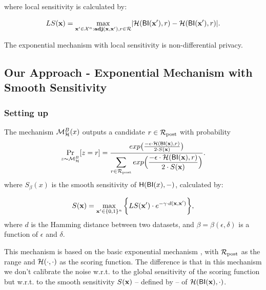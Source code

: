 \documentclass[sigconf]{acmart}
\begin{document}
where local sensitivity is calculated by:

\begin{equation*}
LS(\textbf{x})=\max_{\textbf{x}' \in \mathcal{X}^n:\textbf{adj}(\textbf{x},\textbf{x}'), r\in \mathcal{R}}\lvert \mathcal{H}(\mathsf{BI}(\textbf{x}'), r) - \mathcal{H}(\mathsf{BI}(\textbf{x}'), r)\rvert.
\end{equation*}

The exponential mechanism with local sensitivity is non-differential privacy\cite{dwork2014algorithmic}.


\subsection{Our Approach - Exponential Mechanism with Smooth Sensitivity}
\label{sec_smoo}

\subsubsection{Setting up}

\begin{definition}
\label{def_smoo}
The mechanism $\mathcal{M}^{B}_{\mathcal{H}}(x)$ outputs a candidate $r \in \mathcal{R}_{\textup{post}}$ with probability
\begin{equation*}
\underset{z \thicksim \mathcal{M}^{B}_{\mathcal{H}}}{\Pr}[z=r] = \frac {exp\big(\frac{-\epsilon\cdot\mathcal{H}(\mathsf{BI}(\textbf{x}),r)}{2\cdot S(\textbf{x})}\big)}
{\displaystyle\sum_{r\in\mathcal{R}_{\textup{post}}} exp\Big(\frac{-\epsilon\cdot\mathcal{H}(\mathsf{BI}(\textbf{x}),r)}{2\cdot S(\textbf{x})}\Big)}.
\end{equation*}
where $S_\beta(x)$ is the smooth sensitivity of $\mathsf{H}(\mathsf{BI}(x),-)$, calculated by:

\begin{equation}
  \label{eq:smooth}
   S(\textbf{x})=\max_{\textbf{x}' \in \{0,1\}^{n}}\bigg \{LS(\textbf{x}') \cdot e^{-\gamma\cdot d(\textbf{x},\textbf{x}')}\bigg\},
\end{equation}
where $d$ is the Hamming distance between two datasets, and $\beta =
\beta(\epsilon, \delta)$ is a function of $\epsilon$ and $\delta$. 
\end{definition}

This mechanism is based on the basic exponential mechanism
\cite{talwar}, with $\mathcal{R}_{\textup{post}}$ as the range and
$\mathcal{H}(\cdot,\cdot)$ as the scoring function. The difference is
that in this mechanism we don't calibrate the noise w.r.t. to the
global sensitivity of the scoring function but w.r.t. to the smooth
sensitivity $S(\textbf{x})$ -- defined by \citet{nissim2007smooth}-- of
$\mathcal{H}(\mathsf{BI}(\textbf{x}), \cdot)$.
\end{document}
